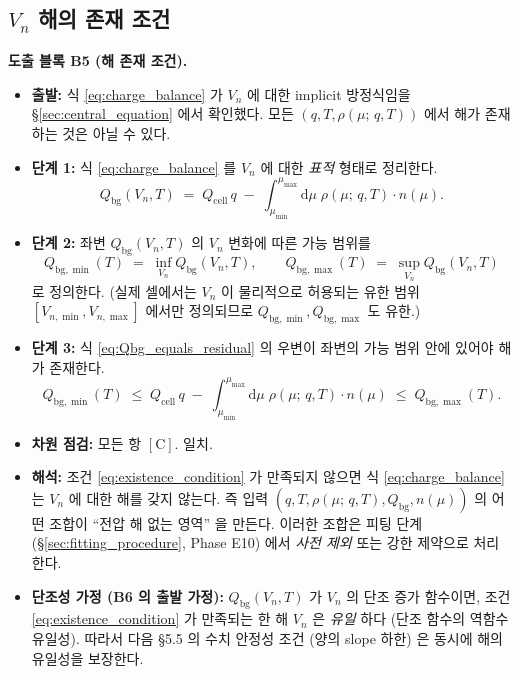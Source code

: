 \documentclass[11pt,a4paper]{article}
\newcommand{\dd}{\mathrm{d}}
\newcommand{\bg}{\mathrm{bg}}
\newcommand{\cell}{\mathrm{cell}}
\newcommand{\Cunit}{\mathrm{C}}
\newcommand{\mucont}{\mu}
\newcommand{\rhomu}{\rho(\mucont;\, q, T)}
\newcommand{\nmu}{n(\mucont)}
\begin{document}
\subsection{$V_n$ 해의 존재 조건}
\label{sec:solution_existence}

\textbf{도출 블록 B5 (해 존재 조건).}

\begin{itemize}
\item \textbf{출발:} 식 \eqref{eq:charge_balance} 가 $V_n$ 에 대한 implicit
      방정식임을 \S\ref{sec:central_equation} 에서 확인했다. 모든 $(q, T,
      \rhomu)$ 에서 해가 존재하는 것은 아닐 수 있다.
\item \textbf{단계 1:} 식 \eqref{eq:charge_balance} 를 $V_n$ 에 대한 \emph{표적}
      형태로 정리한다.
      \begin{equation}
      Q_{\bg}(V_n, T)
      \;=\;
      Q_{\cell}\, q
      \;-\;
      \int_{\mucont_{\min}}^{\mucont_{\max}} \dd\mucont\;
      \rhomu \cdot \nmu .
      \label{eq:Qbg_equals_residual}
      \end{equation}
\item \textbf{단계 2:} 좌변 $Q_{\bg}(V_n, T)$ 의 $V_n$ 변화에 따른 가능 범위를
      \begin{equation}
      Q_{\bg,\min}(T) \;=\; \inf_{V_n} Q_{\bg}(V_n, T), \qquad
      Q_{\bg,\max}(T) \;=\; \sup_{V_n} Q_{\bg}(V_n, T)
      \label{eq:Qbg_range}
      \end{equation}
      로 정의한다. (실제 셀에서는 $V_n$ 이 물리적으로 허용되는 유한 범위
      $[V_{n,\min}, V_{n,\max}]$ 에서만 정의되므로 $Q_{\bg,\min}, Q_{\bg,\max}$
      도 유한.)
\item \textbf{단계 3:} 식 \eqref{eq:Qbg_equals_residual} 의 우변이 좌변의 가능
      범위 안에 있어야 해가 존재한다.
      \begin{equation}
      \boxed{
      Q_{\bg,\min}(T)
      \;\le\;
      Q_{\cell}\, q
      \;-\;
      \int_{\mucont_{\min}}^{\mucont_{\max}} \dd\mucont\;
      \rhomu \cdot \nmu
      \;\le\;
      Q_{\bg,\max}(T).
      }
      \label{eq:existence_condition}
      \end{equation}
\item \textbf{차원 점검:} 모든 항 $[\Cunit]$. 일치.
\item \textbf{해석:} 조건 \eqref{eq:existence_condition} 가 만족되지 않으면 식
      \eqref{eq:charge_balance} 는 $V_n$ 에 대한 해를 갖지 않는다. 즉 입력
      $(q, T, \rhomu, Q_{\bg}, \nmu)$ 의 어떤 조합이 ``전압 해 없는 영역'' 을
      만든다. 이러한 조합은 피팅 단계 (\S\ref{sec:fitting_procedure}, Phase E10)
      에서 \emph{사전 제외} 또는 강한 제약으로 처리한다.
\item \textbf{단조성 가정 (B6 의 출발 가정):} $Q_{\bg}(V_n, T)$ 가 $V_n$ 의 단조
      증가 함수이면, 조건 \eqref{eq:existence_condition} 가 만족되는 한 해 $V_n$
      은 \emph{유일} 하다 (단조 함수의 역함수 유일성). 따라서 다음 \S 5.5 의
      수치 안정성 조건 (양의 slope 하한) 은 동시에 해의 유일성을 보장한다.
\end{itemize}
\end{document}
